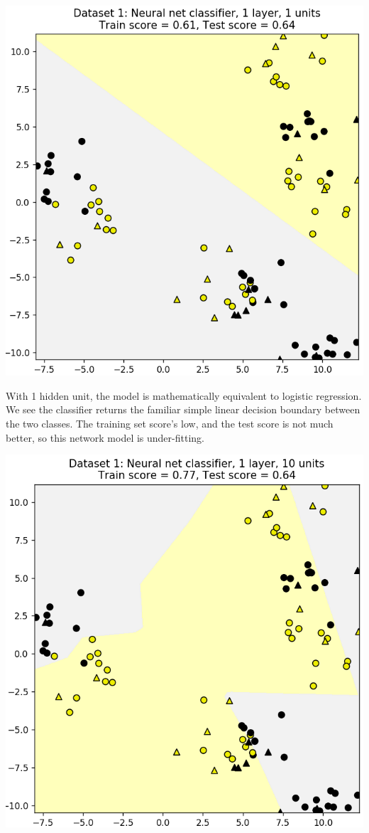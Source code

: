 \begin{multicols}{2}
\begin{center}
	\includegraphics[width=\linewidth]{img/Neural-net-classifier-1layer-1unit.png} 
\end{center}

With 1 hidden unit, the model is mathematically equivalent to logistic regression. We see the classifier returns the familiar simple linear decision boundary between the two classes. The training set score's low, and the test score is not much better, so this network model is under-fitting. 

\begin{center}
	\includegraphics[width=\linewidth]{img/Neural-net-classifier-1layer-10units.png} 
\end{center}


\end{multicols}
